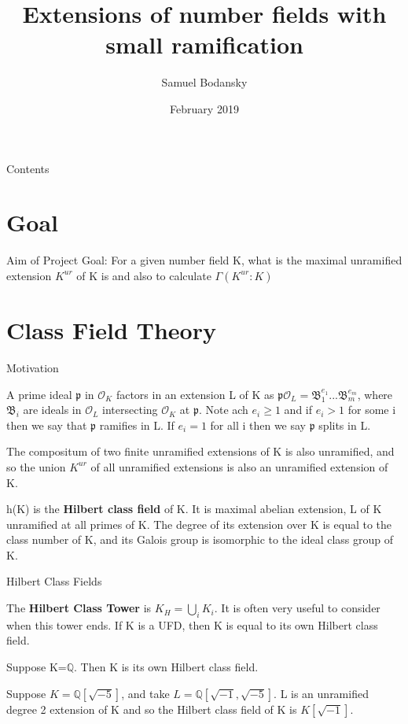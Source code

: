 \documentclass[10pt]{beamer}
\title[Part C Dissertation] %
{Extensions of number fields with small ramification}
\subtitle
{}
\author %
{Samuel Bodansky}
\institute %
{
  University of Oxford
  }
\date %
{February 2019}
\theoremstyle{plain} %
\begin{document}
\begin{frame}
  \titlepage
\end{frame}
\begin{frame}{Contents}
\tableofcontents
\end{frame}

\section{Goal}
\begin{frame}{Aim of Project}
Goal: For a given number field K, what is the maximal unramified extension $K^{ur}$ of K is and also to calculate $\Gamma(K^{ur}:K)$

\end{frame}

\section{Class Field Theory}

\begin{frame}{Motivation}
\begin{definition}
A prime ideal $\mathfrak{p}$ in $\mathcal{O}_K$ factors in an extension L of K as
$\mathfrak{p}\mathcal{O}_L=\mathfrak{B}_1^{e_1}...\mathfrak{B}_m^{e_m}$, where $\mathfrak{B}_i$ are ideals in $\mathcal{O}_L$ intersecting $\mathcal{O}_K$ at $\mathfrak{p}$. Note ach $e_i\geq1$ and if $e_i>1$ for some i then we say that $\mathfrak{p}$ ramifies in L. If $e_i=1$ for all i then we say $\mathfrak{p}$ splits in L.
\end{definition}
    \begin{theorem}
The compositum of two finite unramified extensions of K is also unramified, and so the union $K^{ur}$ of all unramified extensions is also an unramified extension of K.
\end{theorem}
\begin{definition}
h(K) is the \textbf{Hilbert class field} of K. It is maximal abelian extension, L of K unramified at all primes of K. The degree of its extension over K is equal to the class number of K, and its Galois group is isomorphic to the ideal class group of K.
\end{definition}
\end{frame}
\begin{frame}{Hilbert Class Fields}
  \begin{definition}
The \textbf{Hilbert Class Tower} is $K_H=\bigcup_{i}K_{i}$. It is often very useful to consider when this tower ends. If K is a UFD, then K is equal to its own Hilbert class field.  
\end{definition}
    \begin{example}
    Suppose K=$\mathbb{Q}$. Then K is its own Hilbert class field. 
\end{example}
\begin{example}
    Suppose $K=\mathbb{Q}[\sqrt{-5}]$, and take $L=\mathbb{Q}[\sqrt{-1},\sqrt{-5}]$. L is an unramified degree 2 extension of K and so the Hilbert class field of K is $K[\sqrt{-1}]$.
\end{example}

\end{frame}
\end{document}
